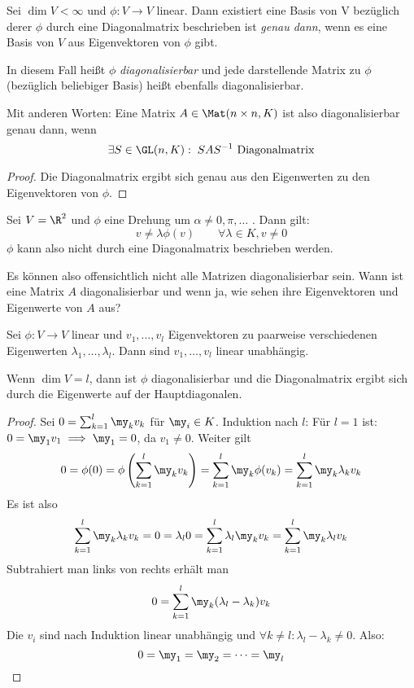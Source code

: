 \documentclass{mycourse}
\begin{document}
\begin{prop}
\label{prop:10.2}
Sei $\dim V < \infty$ und $\phi:V\to V$ linear.
Dann existiert eine Basis von V bezüglich derer $\phi$ durch eine Diagonalmatrix beschrieben ist
\emph{genau dann}, wenn es eine Basis von $V$ aus Eigenvektoren von $\phi$ gibt.

In diesem Fall heißt $\phi$ \emph{diagonalisierbar} und jede darstellende Matrix zu $\phi$ (bezüglich beliebiger Basis)
heißt ebenfalls diagonalisierbar.

Mit anderen Worten:
Eine Matrix $A\in\Mat(n\times n, K)$ ist also diagonalisierbar genau dann, wenn
\[
\exists S\in \GL(n,K):\; SAS^{-1} \text{ Diagonalmatrix}
\]
\begin{proof}
Die Diagonalmatrix ergibt sich genau aus den Eigenwerten zu den Eigenvektoren von $\phi$.
\end{proof}
\end{prop}

Sei $V=\R^2$ und $\phi$ eine Drehung um $\alpha\neq 0,\pi,\dotsc$ .
Dann gilt:
\[
v\neq \lambda\phi(v) \qquad \forall\lambda\in K,v\neq 0
\]
$\phi$ kann also nicht durch eine Diagonalmatrix beschrieben werden.

Es können also offensichtlich nicht alle Matrizen diagonalisierbar sein.
Wann ist eine Matrix $A$ diagonalisierbar und wenn ja, wie sehen ihre Eigenvektoren und Eigenwerte von $A$ aus?

\begin{prop}
\label{prop:10.3}
Sei $\phi:V\to V$ linear und $v_1,\dotsc,v_l$ Eigenvektoren zu paarweise verschiedenen Eigenwerten $\lambda_1,\dotsc,\lambda_l$.
Dann sind $v_1,\dotsc,v_l$ linear unabhängig.

Wenn $\dim V=l$, dann ist $\phi$ diagonalisierbar und die Diagonalmatrix ergibt sich durch die Eigenwerte auf der Hauptdiagonalen.
\begin{proof}

Sei $0=\sum_{k=1}^l\my_kv_k$ für $\my_i\in K$.
Induktion nach $l$:
Für $l=1$ ist: $0=\my_1v_1 \implies \my_1=0$, da $v_1\neq 0$.
Weiter gilt
\[
0=\phi(0)=\phi\left(\sum_{k=1}^l\my_kv_k\right)=\sum_{k=1}^l\my_k\phi(v_k)=\sum_{k=1}^l\my_k\lambda_kv_k
\]
Es ist also
\[
	\sum_{k=1}^l\my_k\lambda_kv_k = 0 = \lambda_l 0= \sum_{k=1}^l\lambda_l\my_kv_k = \sum_{k=1}^l\my_k\lambda_{l}v_k
\]
Subtrahiert man links von rechts erhält man
\[
	0= \sum_{k=1}^{l}\my_k(\lambda_{l}-\lambda_k)v_k 
\]
Die $v_i$ sind nach Induktion linear unabhängig und $\forall k\neq l:\lambda_{l}-\lambda_k \neq 0$.
Also:
\[
0=\my_1=\my_2=\dotsb=\my_{l}
\]
\end{proof}
\end{prop}
\end{document}
